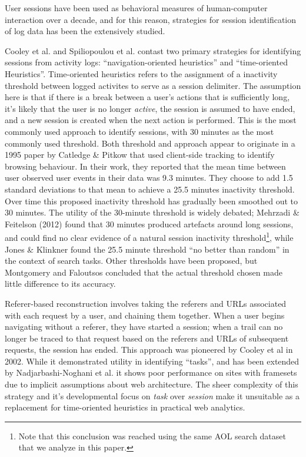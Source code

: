 User sessions have been used as behavioral measures of human-computer interaction over a decade, and for this reason, strategies for session identification of log data has been the extensively studied\cite{eickhoff2014lessons}.

Cooley et al.\cite{cooley1999data} and Spiliopoulou et al.\cite{spiliopoulou2003framework} contast two primary strategies for identifying sessions from activity logs: ``navigation-oriented heuristics'' and ``time-oriented Heuristics''.  Time-oriented heuristics refers to the assignment of a inactivity threshold between logged activites to serve as a session delimiter.  The assumption here is that if there is a break between a user's actions that is sufficiently long, it's likely that the user is no longer \emph{active}, the session is assumed to have ended, and a new session is created when the next action is performed. This is the most commonly used approach to identify sessions, with 30 minutes as the most commonly used threshold\cite{spiliopoulou2003framework,eickhoff2014lessons,ortega2010differences}.  Both threshold and approach appear to originate in a 1995 paper by Catledge \& Pitkow\cite{catledge1995characterizing} that used client-side tracking to identify browsing behaviour. In their work, they reported that the mean time between user observed user events in their data was 9.3 minutes.  They choose to add 1.5 standard deviations to that mean to achieve a 25.5 minutes inactivity threshold.  Over time this proposed inactivity threshold has gradually been smoothed out to 30 minutes.  The utility of the 30-minute threshold is widely debated; Mehrzadi \& Feitelson (2012) \cite{mehrzadi2012onextracting} found that 30 minutes produced artefacts around long sessions, and could find no clear evidence of a natural session inactivity threshold\footnote{Note that this conclusion was reached using the same AOL search dataset that we analyze in this paper.}, while Jones \& Klinkner\cite{jones2008beyond} found the 25.5 minute threshold ``no better than random'' in the context of search tasks. Other thresholds have been proposed, but Montgomery and Faloutsos\cite{montgomery2001identifying} concluded that the actual threshold chosen made little difference to its accuracy.

Referer-based reconstruction involves taking the referers and URLs associated with each request by a user, and chaining them together. When a user begins navigating without a referer, they have started a session; when a trail can no longer be traced to that request based on the referers and URLs of subsequent requests, the session has ended.  This approach was pioneered by Cooley et al in 2002\cite{cooley1999data}.  While it demonstrated utility in identifying ``tasks'', and has been extended by Nadjarbashi-Noghani et al.\cite{nadjarbashi2004improving} it shows poor performance on sites with framesets due to implicit assumptions about web architecture\cite{berendt2003impact}. The sheer complexity of this strategy and it's developmental focus on \emph{task} over \emph{session} make it unsuitable as a replacement for time-oriented heuristics in practical web analytics.

